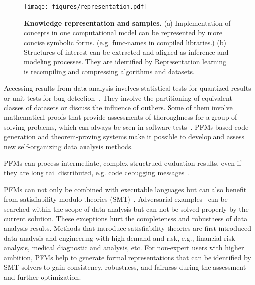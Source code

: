   
  \begin{figure*}[h]
    \centering
    \texttt{[image: figures/representation.pdf]} %
    \caption{\textbf{Knowledge representation and samples.} (a) Implementation of concepts in one computational model can be represented by more concise symbolic forms. (e.g. func-names in compiled libraries.) (b) Structures of interest can be extracted and aligned as inference and modeling processes. They are identified by  Representation learning is recompiling and compressing algorithms and datasets.}
    \label{fig:representation_learning}
  \end{figure*}
  
  Accessing results from data analysis involves statistical tests for quantized results or unit tests for bug detection~\cite{schafer2023empirical,alshahwan2024automated}. They involve the partitioning of equivalent classes of datasets or discuss the influence of outliers. Some of them involve mathematical proofs that provide assessments of thoroughness for a group of solving problems, which can always be seen in software tests~\cite{schumann2013automated}. PFMs-based code generation and theorem-proving systems \cite{Pei2023CanLL,Wang2024TheoremLlamaTG, Rodriguez2024ExploringAO} make it possible to develop and assess new self-organizing data analysis methods. 

  
\begin{takeawaybox}
PFMs can process intermediate, complex structrued evaluation results, even if they are long tail distributed, e.g. code debugging messages~\cite{KamoiZZHZ24}.
\end{takeawaybox}


  
  PFMs can not only be combined with executable languages but can also benefit from satisfiability modulo theories (SMT)~\cite{ye2024satlm}. Adversarial examples~\cite{jha2023counterexample} can be searched within the scope of data analysis but can not be solved properly by the current solution. These exceptions hurt the completeness and robustness of data analysis results. Methods that introduce satisfiability theories are first introduced data analysis and engineering with high demand and risk, e.g., financial risk analysis, medical diagnostic and analysis, etc. For non-expert users with higher ambition, PFMs help to generate formal representations that can be identified by SMT solvers to gain consistency, robustness, and fairness during the assessment and further optimization.
  
